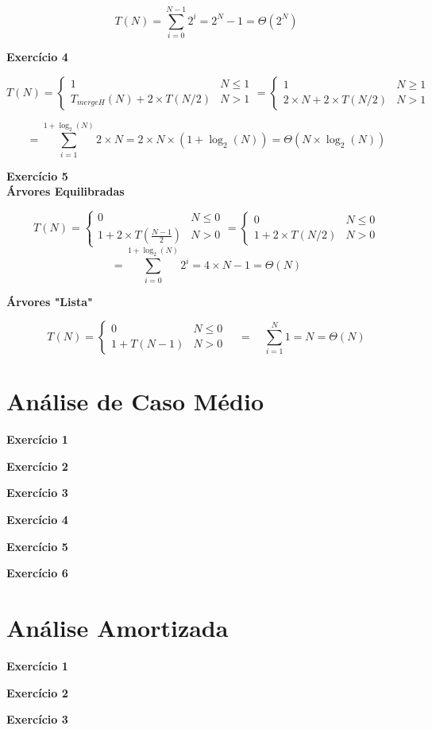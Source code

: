 \documentclass[a4paper,11pt]{article}
\begin{document}
	\[
		T(N) = \sum_{i=0}^{N-1} 2^i = 2^N - 1 = \Theta(2^N)
	\]
	
	\noindent \textbf{Exercício 4}
	
	\[
		T(N) = 
		\begin{cases}
			1 & N \leq 1 \\
			T_{mergeH}(N) + 2 \times T(N / 2) & N > 1
		\end{cases}
		=
		\begin{cases}
			1 & N \geq 1 \\
			2 \times N + 2 \times T(N/2) & N > 1
		\end{cases}
	\]
	
	\[
		= \sum_{i=1}^{1 + \log_2(N)} 2 \times N = 2 \times N \times (1 + \log_2(N)) = \Theta(N \times \log_2(N))
	\]
	
	\noindent \textbf{Exercício 5}\\
	
	\noindent \textbf{Árvores Equilibradas}
	
	\[
		T(N) = 
		\begin{cases}
			0 & N \leq 0 \\
			1 + 2 \times T(\frac{N-1}{2}) & N > 0
		\end{cases}
		=
		\begin{cases}
			0 & N \leq 0 \\
			1 + 2 \times T(N/2) & N > 0
		\end{cases}
	\]
	\[
		= \sum_{i=0}^{1 + \log_2(N)} 2^i = 4 \times N - 1 = \Theta(N)
	\]
	
	\noindent \textbf{Árvores "Lista"}
	
	\[
	T(N) = 
	\begin{cases}
		0 & N \leq 0 \\
		1 + T(N - 1) & N > 0
	\end{cases}
	\quad = \quad \sum_{i=1}^{N} 1 = N = \Theta(N)
	\]
	
	
	
	\section{Análise de Caso Médio}
	
	\noindent \textbf{Exercício 1}
	
	\noindent \textbf{Exercício 2}
	
	\noindent \textbf{Exercício 3}
	
	\noindent \textbf{Exercício 4}
	
	\noindent \textbf{Exercício 5}
	
	\noindent \textbf{Exercício 6}
	
	
	\section{Análise Amortizada}
	
	\noindent \textbf{Exercício 1}
	
	\noindent \textbf{Exercício 2}
	
	\noindent \textbf{Exercício 3}
	
	
\end{document}
